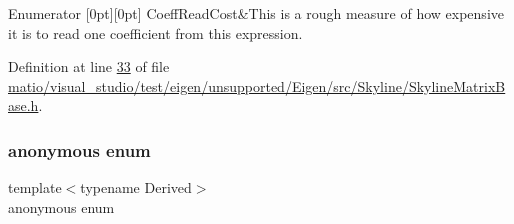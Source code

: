\begin{DoxyEnumFields}{Enumerator}
[0pt][0pt]{}\mbox{\label{class_eigen_1_1_skyline_matrix_base_a811ba3961cb927ae5fa84ed278ebceeaa2f2f2c74314a961757ff965e3b7df794}} 
Coeff\+Read\+Cost&This is a rough measure of how expensive it is to read one coefficient from this expression. \\
\hline

\end{DoxyEnumFields}


Definition at line \hyperlink{matio_2visual__studio_2test_2eigen_2unsupported_2_eigen_2src_2_skyline_2_skyline_matrix_base_8h_source_l00033}{33} of file \hyperlink{matio_2visual__studio_2test_2eigen_2unsupported_2_eigen_2src_2_skyline_2_skyline_matrix_base_8h_source}{matio/visual\+\_\+studio/test/eigen/unsupported/\+Eigen/src/\+Skyline/\+Skyline\+Matrix\+Base.\+h}.

\mbox{\label{class_eigen_1_1_skyline_matrix_base_a7ffcd7f47cfb3466a627116215393d8e}} 
\subsubsection{\texorpdfstring{anonymous enum}{anonymous enum}}
{\footnotesize\ttfamily template$<$typename Derived$>$ \\
anonymous enum}

